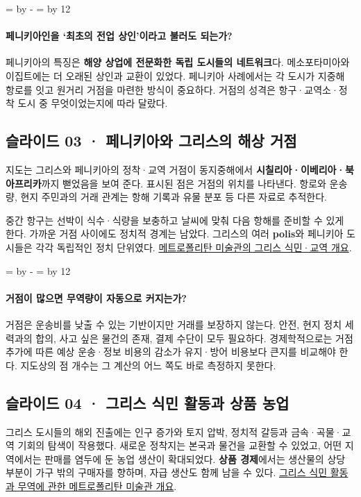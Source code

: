 \documentclass[10pt,a4paper]{article}
\newcommand{\ReserveQuestionSpace}{%
  \par\begingroup
  \dimen0=\pagegoal \advance\dimen0 by -\pagetotal
  \dimen2=\baselineskip \multiply\dimen2 by 12
  \ifdim\dimen0<\dimen2 \newpage\fi
  \endgroup}
\begin{document}
\ReserveQuestionSpace
\paragraph{페니키아인을 ‘최초의 전업 상인’이라고 불러도 되는가?}
페니키아의 특징은 \textbf{해양 상업에 전문화한 독립 도시들의 네트워크}다. 메소포타미아와 이집트에는 더 오래된 상인과 교환이 있었다. 페니키아 사례에서는 각 도시가 지중해 항로를 잇고 원거리 거점을 마련한 방식이 중요하다. 거점의 성격은 항구·교역소·정착 도시 중 무엇이었는지에 따라 달랐다.\par

\subsection{슬라이드 03 · 페니키아와 그리스의 해상 거점}
지도는 그리스와 페니키아의 정착·교역 거점이 동지중해에서 \textbf{시칠리아·이베리아·북아프리카}까지 뻗었음을 보여 준다. 표시된 점은 거점의 위치를 나타낸다. 항로와 운송량, 현지 주민과의 거래 관계는 항해 기록과 유물 분포 등 다른 자료로 추적한다.\par

중간 항구는 선박이 식수·식량을 보충하고 날씨에 맞춰 다음 항해를 준비할 수 있게 한다. 가까운 거점 사이에도 정치적 경계는 남았다. 그리스의 여러 \textbf{polis}와 페니키아 도시들은 각각 독립적인 정치 단위였다. \href{https://www.metmuseum.org/it/essays/ancient-greek-colonization-and-trade-and-their-influence-on-greek-art}{메트로폴리탄 미술관의 그리스 식민·교역 개요}.\par

\ReserveQuestionSpace
\paragraph{거점이 많으면 무역량이 자동으로 커지는가?}
거점은 운송비를 낮출 수 있는 기반이지만 거래를 보장하지 않는다. 안전, 현지 정치 세력과의 합의, 사고 싶은 물건의 존재, 결제 수단이 모두 필요하다. 경제학적으로는 거점 추가에 따른 예상 운송·정보 비용의 감소가 유지·방어 비용보다 큰지를 비교해야 한다. 지도상의 점 개수는 그 계산의 어느 쪽도 바로 측정하지 못한다.\par

\subsection{슬라이드 04 · 그리스 식민 활동과 상품 농업}
그리스 도시들의 해외 진출에는 인구 증가와 토지 압박, 정치적 갈등과 금속·곡물·교역 기회의 탐색이 작용했다. 새로운 정착지는 본국과 물건을 교환할 수 있었고, 어떤 지역에서는 판매를 염두에 둔 농업 생산이 확대되었다. \textbf{상품 경제}에서는 생산물의 상당 부분이 가구 밖의 구매자를 향하며, 자급 생산도 함께 남을 수 있다. \href{https://www.metmuseum.org/it/essays/ancient-greek-colonization-and-trade-and-their-influence-on-greek-art}{그리스 식민 활동과 무역에 관한 메트로폴리탄 미술관 개요}.\par
\end{document}

